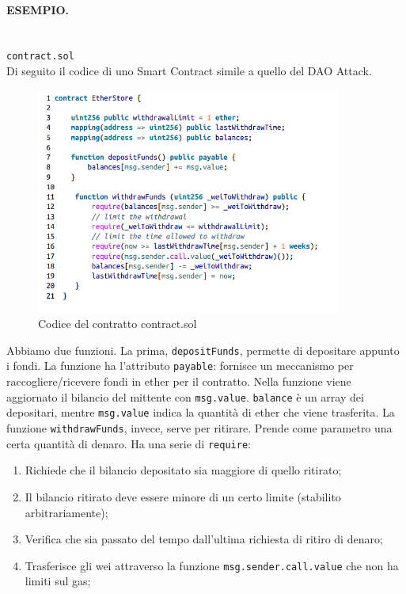\paragraph{ESEMPIO.}\ \\
\verb|contract.sol|\\
Di seguito il codice di uno Smart Contract simile a quello del DAO Attack.

\begin{figure}[H]
    \centering
    \includegraphics[width=10cm, keepaspectratio]{capitoli/ethereum/imgs/dao_buono.png}
    \caption{Codice del contratto contract.sol}
\end{figure}

Abbiamo due funzioni. La prima, \verb|depositFunds|, permette di depositare
appunto i fondi.
La funzione ha l'attributo \verb|payable|: fornisce un meccanismo per
raccogliere/ricevere fondi in ether per il contratto.
Nella funzione viene aggiornato il bilancio del mittente con \verb|msg.value|.
\verb|balance| è un array dei depositari, mentre \verb|msg.value| indica la
quantità di ether che viene trasferita.
La funzione \verb|withdrawFunds|, invece, serve per ritirare.
Prende come parametro una certa quantità di denaro.
Ha una serie di \verb|require|:

\begin{enumerate}
    \item Richiede che il bilancio depositato sia maggiore di quello ritirato;
    \item Il bilancio ritirato deve essere minore di un certo limite
          (stabilito arbitrariamente);
    \item Verifica che sia passato del tempo dall'ultima richiesta di ritiro di
          denaro;
    \item Trasferisce gli wei attraverso la funzione \verb|msg.sender.call.value|
          che non ha limiti sul gas;
\end{enumerate}

